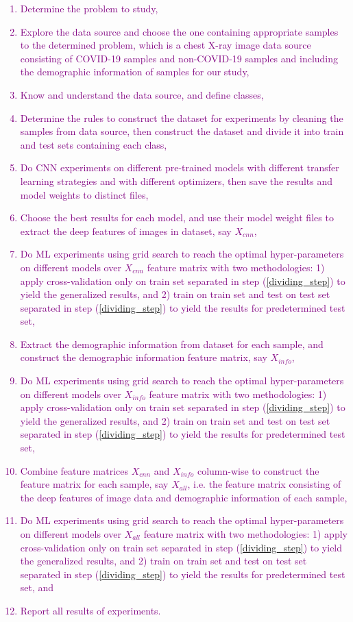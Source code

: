 \textcolor{purple}{
\begin{enumerate}
    \item Determine the problem to study,
    \item Explore the data source and choose the one containing appropriate samples to the determined problem, which is a chest X-ray image data source consisting of COVID-19 samples and non-COVID-19 samples and including the demographic information of samples for our study,
    \item Know and understand the data source, and define classes,
    \item Determine the rules to construct the dataset for experiments by cleaning the samples from data source, then construct the dataset and divide it into train and test sets containing each class, \label{dividing_step}
    \item Do CNN experiments on different pre-trained models with different transfer learning strategies and with different optimizers, then save the results and model weights to distinct files,
    \item Choose the best results for each model, and use their model weight files to extract the deep features of images in dataset, say $X_{cnn}$,
    \item Do ML experiments using grid search to reach the optimal hyper-parameters on different models over $X_{cnn}$ feature matrix with two methodologies: 1) apply cross-validation only on train set separated in step (\ref{dividing_step}) to yield the generalized results, and 2) train on train set and test on test set separated in step (\ref{dividing_step}) to yield the results for predetermined test set, \label{ML_experiment_step}
    \item Extract the demographic information from dataset for each sample, and construct the demographic information feature matrix, say $X_{info}$,
    \item Do ML experiments using grid search to reach the optimal hyper-parameters on different models over $X_{info}$ feature matrix with two methodologies: 1) apply cross-validation only on train set separated in step (\ref{dividing_step}) to yield the generalized results, and 2) train on train set and test on test set separated in step (\ref{dividing_step}) to yield the results for predetermined test set,
    \item Combine feature matrices $X_{cnn}$ and $X_{info}$ column-wise to construct the feature matrix for each sample, say $X_{all}$, i.e. the feature matrix consisting of the deep features of image data and demographic information of each sample,
    \item Do ML experiments using grid search to reach the optimal hyper-parameters on different models over $X_{all}$ feature matrix with two methodologies: 1) apply cross-validation only on train set separated in step (\ref{dividing_step}) to yield the generalized results, and 2) train on train set and test on test set separated in step (\ref{dividing_step}) to yield the results for predetermined test set, and
    \item Report all results of experiments.
\end{enumerate}
}

